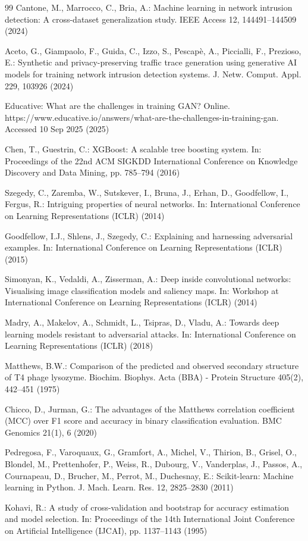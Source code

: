 \documentclass[11pt, a4paper]{article}
\begin{document}
\begin{thebibliography}{99}
Cantone, M., Marrocco, C., Bria, A.: Machine learning in network intrusion detection: A cross-dataset generalization study. IEEE Access 12, 144491--144509 (2024)

Aceto, G., Giampaolo, F., Guida, C., Izzo, S., Pescap\`{e}, A., Piccialli, F., Prezioso, E.: Synthetic and privacy-preserving traffic trace generation using generative AI models for training network intrusion detection systems. J. Netw. Comput. Appl. 229, 103926 (2024)

Educative: What are the challenges in training GAN? Online. https://www.educative.io/answers/what-are-the-challenges-in-training-gan. Accessed 10 Sep 2025 (2025)

Chen, T., Guestrin, C.: XGBoost: A scalable tree boosting system. In: Proceedings of the 22nd ACM SIGKDD International Conference on Knowledge Discovery and Data Mining, pp. 785--794 (2016)

Szegedy, C., Zaremba, W., Sutskever, I., Bruna, J., Erhan, D., Goodfellow, I., Fergus, R.: Intriguing properties of neural networks. In: International Conference on Learning Representations (ICLR) (2014)

Goodfellow, I.J., Shlens, J., Szegedy, C.: Explaining and harnessing adversarial examples. In: International Conference on Learning Representations (ICLR) (2015)

Simonyan, K., Vedaldi, A., Zisserman, A.: Deep inside convolutional networks: Visualising image classification models and saliency maps. In: Workshop at International Conference on Learning Representations (ICLR) (2014)

Madry, A., Makelov, A., Schmidt, L., Tsipras, D., Vladu, A.: Towards deep learning models resistant to adversarial attacks. In: International Conference on Learning Representations (ICLR) (2018)

Matthews, B.W.: Comparison of the predicted and observed secondary structure of T4 phage lysozyme. Biochim. Biophys. Acta (BBA) - Protein Structure 405(2), 442--451 (1975)

Chicco, D., Jurman, G.: The advantages of the Matthews correlation coefficient (MCC) over F1 score and accuracy in binary classification evaluation. BMC Genomics 21(1), 6 (2020)

Pedregosa, F., Varoquaux, G., Gramfort, A., Michel, V., Thirion, B., Grisel, O., Blondel, M., Prettenhofer, P., Weiss, R., Dubourg, V., Vanderplas, J., Passos, A., Cournapeau, D., Brucher, M., Perrot, M., Duchesnay, E.: Scikit-learn: Machine learning in Python. J. Mach. Learn. Res. 12, 2825--2830 (2011)

Kohavi, R.: A study of cross-validation and bootstrap for accuracy estimation and model selection. In: Proceedings of the 14th International Joint Conference on Artificial Intelligence (IJCAI), pp. 1137--1143 (1995)

\end{thebibliography}
\end{document}
